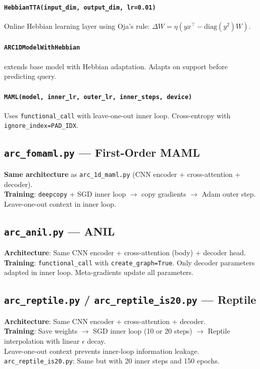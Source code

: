\documentclass[11pt,a4paper]{article}
\begin{document}
\paragraph{\texttt{HebbianTTA(input\_dim, output\_dim, lr=0.01)}}
Online Hebbian learning layer using Oja's rule: $\Delta W = \eta(yx^\top - \text{diag}(y^2)W)$.

\paragraph{\texttt{ARC1DModelWithHebbian}} extends base model with Hebbian adaptation. Adapts on support before predicting query.

\paragraph{\texttt{MAML(model, inner\_lr, outer\_lr, inner\_steps, device)}}
Uses \texttt{functional\_call} with leave-one-out inner loop. Cross-entropy with \texttt{ignore\_index=PAD\_IDX}.

\subsection{\texttt{arc\_fomaml.py} --- First-Order MAML}
\textbf{Same architecture} as \texttt{arc\_1d\_maml.py} (CNN encoder + cross-attention + decoder).\\
\textbf{Training}: \texttt{deepcopy} + SGD inner loop $\to$ copy gradients $\to$ Adam outer step. Leave-one-out context in inner loop.

\subsection{\texttt{arc\_anil.py} --- ANIL}
\textbf{Architecture}: Same CNN encoder + cross-attention (body) + decoder head.\\
\textbf{Training}: \texttt{functional\_call} with \texttt{create\_graph=True}. Only decoder parameters adapted in inner loop. Meta-gradients update all parameters.

\subsection{\texttt{arc\_reptile.py} / \texttt{arc\_reptile\_is20.py} --- Reptile}
\textbf{Architecture}: Same CNN encoder + cross-attention + decoder.\\
\textbf{Training}: Save weights $\to$ SGD inner loop (10 or 20 steps) $\to$ Reptile interpolation with linear $\epsilon$ decay.\\
Leave-one-out context prevents inner-loop information leakage.\\
\texttt{arc\_reptile\_is20.py}: Same but with 20 inner steps and 150 epochs.
\end{document}
